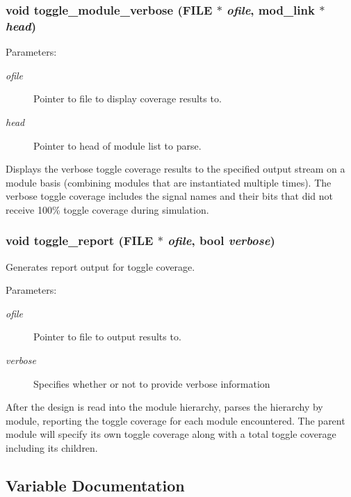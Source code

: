 \subsubsection{\setlength{\rightskip}{0pt plus 5cm}void toggle\_\-module\_\-verbose (FILE $\ast$ {\em ofile}, {\bf mod\_\-link} $\ast$ {\em head})}\label{toggle_8c_a10}


\begin{Desc}
\item[Parameters:]
\begin{description}
\item[{\em ofile}]Pointer to file to display coverage results to. \item[{\em head}]Pointer to head of module list to parse.\end{description}
\end{Desc}
Displays the verbose toggle coverage results to the specified output stream on a module basis (combining modules that are instantiated multiple times). The verbose toggle coverage includes the signal names and their bits that did not receive 100\% toggle coverage during simulation. 
\subsubsection{\setlength{\rightskip}{0pt plus 5cm}void toggle\_\-report (FILE $\ast$ {\em ofile}, {\bf bool} {\em verbose})}\label{toggle_8c_a11}


Generates report output for toggle coverage. 

\begin{Desc}
\item[Parameters:]
\begin{description}
\item[{\em ofile}]Pointer to file to output results to. \item[{\em verbose}]Specifies whether or not to provide verbose information\end{description}
\end{Desc}
After the design is read into the module hierarchy, parses the hierarchy by module, reporting the toggle coverage for each module encountered. The parent module will specify its own toggle coverage along with a total toggle coverage including its children. 

\subsection{Variable Documentation}
